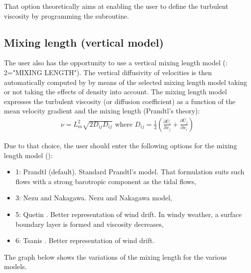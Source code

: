 That option theoretically aims at enabling the user to define the turbulent
viscosity by programming the   subroutine.

\subsection{Mixing length (vertical model)}

The user also has the opportunity to use a vertical mixing length model
(: 2="MIXING LENGTH"). The vertical
diffusivity of velocities is then automatically computed by  by means
of the selected mixing length model taking or not taking the effects of density
into account. The mixing length model expresses the turbulent viscosity (or
diffusion coefficient) as a function of the mean velocity gradient and the
mixing length (Prandtl's theory):
\begin{align}
\nu =L_{m}^{2} \sqrt{2D_{ij} D_{ij}} \textrm{ where }  D_{ij} =\frac{1}{2}
\left(\frac{\partial \bar{U}_{i} }{\partial x_{j} }
      +\frac{\partial \bar{U}_{j}}{\partial x_{i} } \right)
\end{align}

Due to that choice, the user should enter the following options for the mixing
length model ():

\begin{itemize}
\item  1: Prandtl (default). Standard Prandtl's model. That formulation suits
such flows with a strong barotropic component as the tidal flows,

\item  3: Nezu and Nakagawa. Nezu and Nakagawa model,

\item  5: Quetin \cite{Quetin1977}. Better representation of wind drift.
In windy weather, a surface boundary layer is formed and viscosity decreases,

\item  6: Tsanis \cite{Tsanis1989}. Better representation of wind drift.
\end{itemize}

The graph below shows the variations of the mixing length for the various models.

